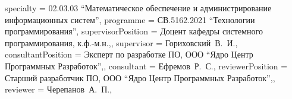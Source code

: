 {    specialty          = {02.03.03 \enquote{Математическое обеспечение и администрирование информационных систем}},
    programme          = {СВ.5162.2021 \enquote{Технологии программирования}},
    supervisorPosition = {Доцент кафедры системного программирования, к.ф.-м.н.,},
    supervisor         = {Гориховский~В.~И.},
    consultantPosition = {Эксперт по разработке ПО, ООО ``Ядро Центр Программных Разработок'',},
    consultant         = {Ефремов~Р.~С.},
    reviewerPosition   = {Старший разработчик ПО, ООО ``Ядро Центр Программных Разработок'',},
    reviewer           = {Черепанов~А.~П.},
}
%
